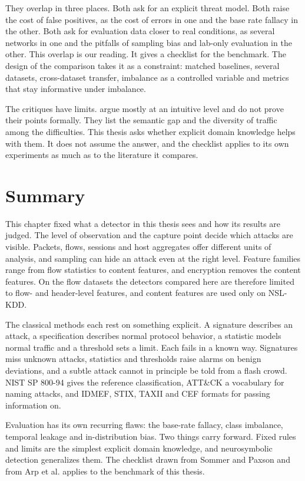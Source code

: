 They overlap in three places. Both ask for an explicit threat model. Both
raise the cost of false positives, as the cost of errors in one and the base
rate fallacy in the other. Both ask for evaluation data closer to real
conditions, as several networks in one and the pitfalls of sampling bias and
lab-only evaluation in the other. This overlap is our reading. It gives a
checklist for the benchmark. The design of the comparison takes it as a
constraint: matched baselines, several datasets, cross-dataset transfer,
imbalance as a controlled variable and metrics that stay informative under
imbalance.

The critiques have limits. \citet{sommer2010outside} argue mostly at an
intuitive level and do not prove their points formally. They list the
semantic gap and the diversity of traffic among the difficulties. This thesis
asks whether explicit domain knowledge helps with them. It does not assume the
answer, and the checklist applies to its own experiments as much as to the
literature it compares.

\section{Summary}
\label{sec:ch2-summary}

This chapter fixed what a detector in this thesis sees and how its results
are judged. The level of observation and the capture point decide which
attacks are visible. Packets, flows, sessions and host aggregates offer
different units of analysis, and sampling can hide an attack even at the
right level. Feature families range from flow statistics to content features,
and encryption removes the content features. On the flow datasets the
detectors compared here are therefore limited to flow- and header-level features, and content features are used only on
NSL-KDD.

The classical methods each rest on something explicit. A signature describes
an attack, a specification describes normal protocol behavior, a statistic
models normal traffic and a threshold sets a limit. Each fails in a known
way. Signatures miss unknown attacks, statistics and thresholds raise alarms
on benign deviations, and a subtle attack cannot in principle be told from a
flash crowd. NIST SP 800-94 gives the reference classification, ATT\&CK a
vocabulary for naming attacks, and IDMEF, STIX, TAXII and CEF formats for
passing information on.

Evaluation has its own recurring flaws: the base-rate fallacy, class
imbalance, temporal leakage and in-distribution bias. Two things carry
forward. Fixed rules and limits are the simplest explicit domain knowledge,
and neurosymbolic detection generalizes them. The checklist drawn from
Sommer and Paxson and from Arp et al. applies to the benchmark of this
thesis.
